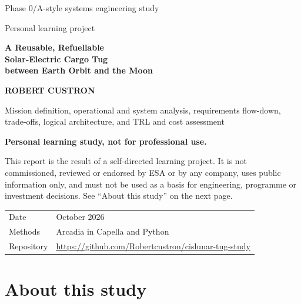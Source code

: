 \documentclass[11pt,a4paper]{article}
\newcommand{\studyauthor}{Robert Custron}
\newcommand{\studydate}{October 2026}
\newcommand{\repourl}{https://github.com/Robertcustron/cislunar-tug-study}
\begin{document}
\begin{titlepage}
\thispagestyle{empty}
\centering
\vspace*{40mm}
{\sffamily Phase 0/A-style systems engineering study\par}
\vspace{2mm}
{\sffamily\small Personal learning project\par}
\vspace{14mm}
{\sffamily\bfseries\fontsize{24}{30}\selectfont A Reusable, Refuellable\\ Solar-Electric Cargo Tug\\ between Earth Orbit and the Moon\par}
\vspace{10mm}
{\sffamily\bfseries\MakeUppercase{\studyauthor}\par}
\vspace{6mm}
{\large Mission definition, operational and system analysis, requirements flow-down,\\ trade-offs, logical architecture, and TRL and cost assessment\par}
\vfill
\begin{noticebox}
\textbf{Personal learning study, not for professional use.}\par\smallskip
\small This report is the result of a self-directed learning project. It is not commissioned, reviewed or endorsed by ESA or by any company, uses public information only, and must not be used as a basis for engineering, programme or investment decisions. See ``About this study'' on the next page.
\end{noticebox}
\vspace{8mm}
{\small
\begin{tabular}{@{}ll}
Date & \studydate \\
Methods & Arcadia in Capella and Python \\
Repository & \url{\repourl}\\
\end{tabular}\par}
\end{titlepage}


\section*{About this study}
\end{document}
